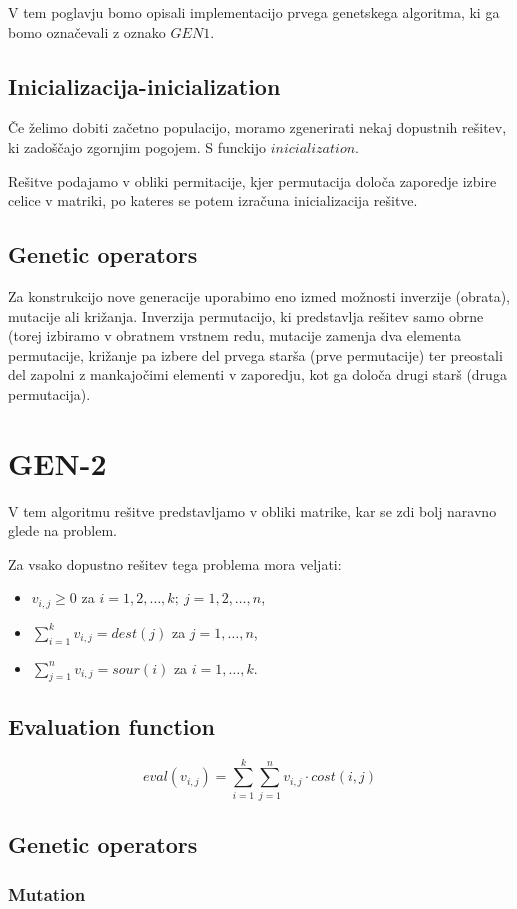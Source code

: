 \documentclass[12pt,a4paper,twoside]{article}
\theoremstyle{definition} %
\theoremstyle{plain} %
\numberwithin{equation}{section}  %
\begin{document}
V tem poglavju bomo opisali implementacijo prvega genetskega algoritma, ki ga bomo označevali z oznako $GEN1$.

\subsection{Inicializacija-inicialization}

Če želimo dobiti začetno populacijo, moramo zgenerirati nekaj dopustnih rešitev, ki zadoščajo zgornjim pogojem. S funckijo $inicialization$. 

\noindent Rešitve podajamo v obliki permitacije, kjer permutacija določa zaporedje izbire celice v matriki, po kateres se potem izračuna inicializacija rešitve.

\subsection{Genetic operators}

Za konstrukcijo nove generacije uporabimo eno izmed možnosti inverzije (obrata), mutacije ali križanja. Inverzija permutacijo, ki predstavlja rešitev samo obrne (torej izbiramo v obratnem vrstnem redu, mutacije zamenja dva elementa permutacije, križanje pa izbere del prvega starša (prve permutacije) ter preostali del zapolni z mankajočimi elementi v zaporedju, kot ga določa drugi starš (druga permutacija).

\section{GEN-2}

V tem algoritmu rešitve predstavljamo v obliki matrike, kar se zdi bolj naravno glede na problem.

\noindent Za vsako dopustno rešitev tega problema mora veljati:
\begin{itemize}
\item $v_{i,j} \geq 0$ za $i=1, 2, \dots, k;~ j=1,2, \dots, n$,
\item $\sum\limits_{i=1}^{k} v_{i,j} = dest(j)$ za $j=1, \dots, n$,
\item $\sum\limits_{j=1}^{n} v_{i,j}= sour(i)$ za $i=1, \dots, k$.
\end{itemize}

\subsection{Evaluation function}

$$eval(v_{i,j}) = \sum\limits_{i=1}^{k} \sum\limits_{j=1}^{n} v_{i,j} \cdot cost(i,j)$$

\subsection{Genetic operators}

\subsubsection{Mutation}
\end{document}
